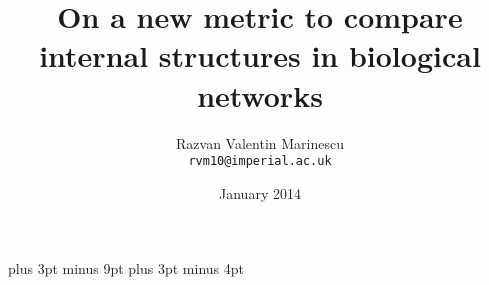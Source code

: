 \documentclass[11pt,a4paper,oneside]{report}
\title{On a new metric to compare internal structures in biological networks}
\date{January 2014}
\author{
  Razvan Valentin Marinescu\\
  \texttt{rvm10@imperial.ac.uk}
}
\begin{document}
\belowdisplayskip=12pt plus 3pt minus 9pt
\belowdisplayshortskip=7pt plus 3pt minus 4pt







\maketitle{}


\tableofcontents













\nocite{*} %





\appendix
\end{document}
